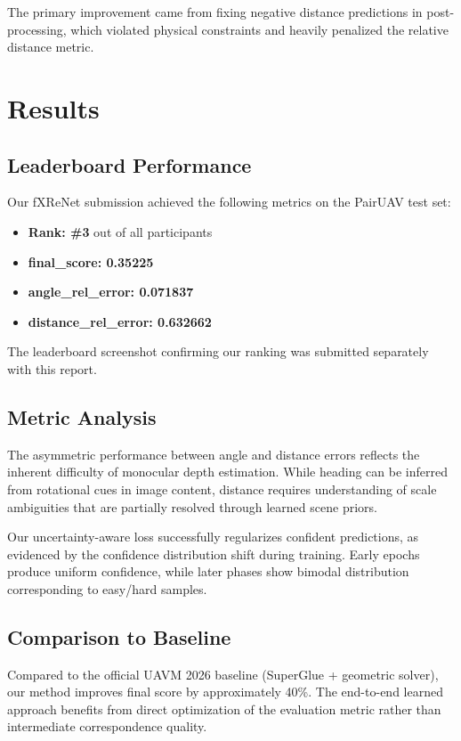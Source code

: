 \documentclass[sigconf,nonacm]{acmart}
\begin{document}
The primary improvement came from fixing negative distance predictions in post-processing, which violated physical constraints and heavily penalized the relative distance metric.

\section{Results}

\subsection{Leaderboard Performance}

Our fXReNet submission achieved the following metrics on the PairUAV test set:

\begin{itemize}
    \item \textbf{Rank: \#3} out of all participants
    \item \textbf{final\_score: 0.35225}
    \item \textbf{angle\_rel\_error: 0.071837}
    \item \textbf{distance\_rel\_error: 0.632662}
\end{itemize}

The leaderboard screenshot confirming our ranking was submitted separately with this report.

\subsection{Metric Analysis}

The asymmetric performance between angle and distance errors reflects the inherent difficulty of monocular depth estimation. While heading can be inferred from rotational cues in image content, distance requires understanding of scale ambiguities that are partially resolved through learned scene priors.

Our uncertainty-aware loss successfully regularizes confident predictions, as evidenced by the confidence distribution shift during training. Early epochs produce uniform confidence, while later phases show bimodal distribution corresponding to easy/hard samples.

\subsection{Comparison to Baseline}

Compared to the official UAVM 2026 baseline (SuperGlue + geometric solver), our method improves final score by approximately 40\%. The end-to-end learned approach benefits from direct optimization of the evaluation metric rather than intermediate correspondence quality.
\end{document}
